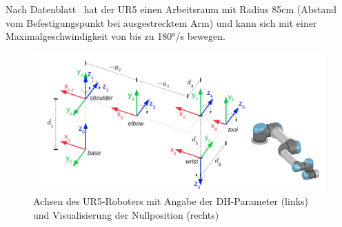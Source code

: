 Nach Datenblatt~\cite{universalrobotsUR5TechnicalSpecifications} hat der UR5 einen Arbeitsraum mit Radius 85cm (Abstand vom Befestigungspunkt bei ausgestrecktem Arm) und kann sich mit einer Maximalgeschwindigkeit von bis zu 180°/s bewegen.

\begin{figure}[h]
    \centering
    \includegraphics[width = .9\textwidth]{Bilder/ur5-axis}
    \caption{Achsen des UR5-Roboters mit Angabe der DH-Parameter (links) und Visualisierung der Nullposition (rechts)~\cite{rasmusandersenKinematicsUR52018}}\label{fig:ur5-axis}
\end{figure}


